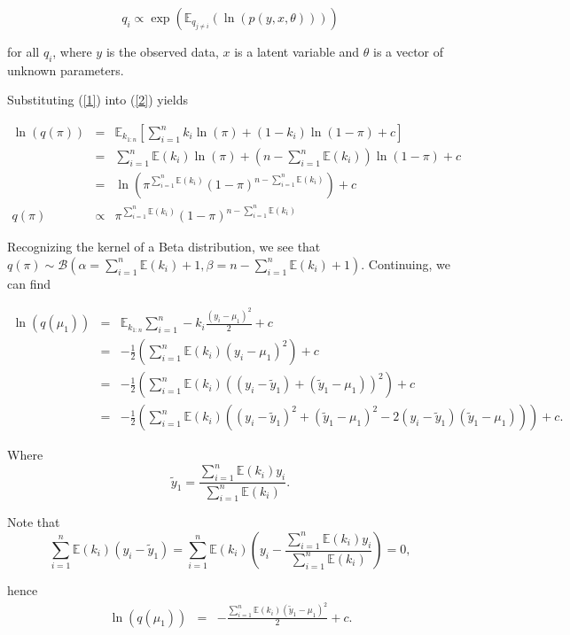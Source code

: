 \documentclass[12pt]{article}\usepackage[]{graphicx}\usepackage[]{color}
\begin{document}
\begin{equation}
\label{2}
q_{i} \propto \exp (\mathbb{E}_{q_{j \neq i}} (\ln(p(y, x, \theta))))
\end{equation}

for all $q_{i}$, where $y$ is the observed data, $x$ is a latent variable and $\theta$ is a vector of unknown parameters.

Substituting (\ref{1}) into (\ref{2}) yields

\begin{eqnarray*}
\ln(q(\pi)) & = & \mathbb{E}_{k_{1:n}} \left[ \sum_{i=1}^{n} k_i \ln(\pi) + (1-k_i) \ln(1-\pi) + c \right] \\
& = & \sum_{i=1}^{n} \mathbb{E}(k_i) \ln (\pi) + (n- \sum_{i=1}^{n}\mathbb{E}(k_i)) \ln(1-\pi) + c \\
& = & \ln(\pi^{\sum_{i=1}^{n}\mathbb{E}(k_i)}(1-\pi)^{n-\sum_{i=1}^{n}\mathbb{E}(k_i)}) + c\\
q(\pi) & \propto & \pi^{\sum_{i=1}^{n}\mathbb{E}(k_i)}(1-\pi)^{n-\sum_{i=1}^{n}\mathbb{E}(k_i)} 
\end{eqnarray*}

Recognizing the kernel of a Beta distribution, we see that $q(\pi) \sim  \mathcal{B} (\alpha = \sum_{i=1}^{n} \mathbb{E}(k_i)+1, \beta = n-\sum_{i=1}^{n}\mathbb{E}(k_i) + 1)$. Continuing, we can find

\begin{eqnarray*}
\ln(q(\mu_1)) & = & \mathbb{E}_{k_{1:n}} \sum_{i=1}^{n} -k_i \frac{(y_i-\mu_1)^2}{2} + c  \\
& = & -\frac{1}{2} \left(\sum_{i=1}^{n}\mathbb{E}(k_i) (y_i-\mu_{1})^2\right) + c \\ 
& = & -\frac{1}{2}\left(\sum_{i=1}^{n}\mathbb{E}(k_i) ((y_i - \tilde{y}_1) + (\tilde{y}_1 - \mu_1))^2 \right)+ c \\
& = & -\frac{1}{2}\left(\sum_{i=1}^{n}\mathbb{E}(k_i) ((y_i - \tilde{y}_1)^2 + (\tilde{y}_1 - \mu_1)^2 - 2(y_i - \tilde{y}_1)(\tilde{y}_1 - \mu_1))\right) + c.
\end{eqnarray*}

Where
$$\tilde{y}_1 = \frac{\sum_{i=1}^{n} \mathbb{E}(k_i)y_i}{\sum_{i=1}^{n} \mathbb{E}(k_i)}.$$

Note that
$$\sum_{i=1}^{n}\mathbb{E}(k_i)(y_i - \tilde{y}_1) = \sum_{i=1}^{n}\mathbb{E}(k_i)\left(y_i - \frac{\sum_{i=1}^{n} \mathbb{E}(k_i)y_i}{\sum_{i=1}^{n} \mathbb{E}(k_i)}\right) = 0,$$

hence 
\begin{eqnarray*}
\ln(q(\mu_1)) & = & -\frac{\sum_{i=1}^{n}\mathbb{E}(k_i) (\tilde{y}_1-\mu_{1})^2}{2} + c.
\end{eqnarray*}
\end{document}
